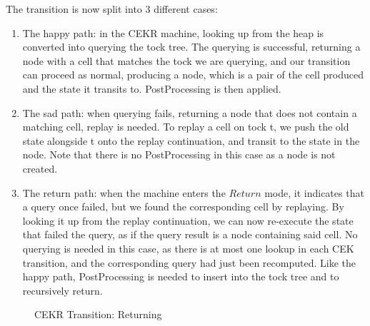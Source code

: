 The transition is now split into 3 different cases:
\begin{enumerate}
    \item The happy path: in the CEKR machine, looking up from the heap is converted into querying the tock tree. The querying is successful, returning a node with a cell that matches the tock we are querying, and our transition can proceed as normal, producing a node, which is a pair of the cell produced and the state it transits to. PostProcessing is then applied.
    \item The sad path: when querying fails, returning a node that does not contain a matching cell, replay is needed. To replay a cell on tock t, we push the old state alongside t onto the replay continuation, and transit to the state in the node. Note that there is no PostProcessing in this case as a node is not created.
    \item The return path: when the machine enters the $Return$ mode, it indicates that a query once failed, but we found the corresponding cell by replaying. By looking it up from the replay continuation, we can now re-execute the state that failed the query, as if the query result is a node containing said cell. No querying is needed in this case, as there is at most one lookup in each CEK transition, and the corresponding query had just been recomputed. Like the happy path, PostProcessing is needed to insert into the tock tree and to recursively return.
\end{enumerate}

\begin{figure}
    \caption{CEKR Transition: Returning}
\end{figure}

